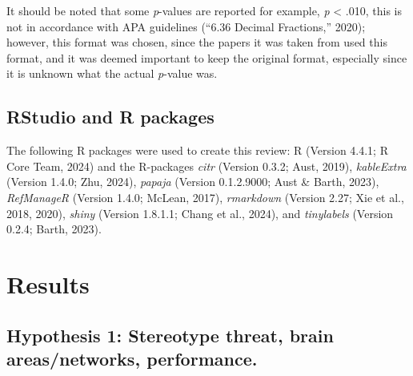 \documentclass[
  stu, a4paper,floatsintext]{apa7}
\begin{document}
It should be noted that some \emph{p}-values are reported for example, \emph{p} \textless{} .010, this is not in accordance with APA guidelines ({``6.36 {Decimal Fractions},''} 2020); however, this format was chosen, since the papers it was taken from used this format, and it was deemed important to keep the original format, especially since it is unknown what the actual \emph{p}-value was.

\subsection{RStudio and R packages}\label{rstudio-and-r-packages}

The following R packages were used to create this review: R (Version 4.4.1; R Core Team, 2024) and the R-packages \emph{citr} (Version 0.3.2; Aust, 2019), \emph{kableExtra} (Version 1.4.0; Zhu, 2024), \emph{papaja} (Version 0.1.2.9000; Aust \& Barth, 2023), \emph{RefManageR} (Version 1.4.0; McLean, 2017), \emph{rmarkdown} (Version 2.27; Xie et al., 2018, 2020), \emph{shiny} (Version 1.8.1.1; Chang et al., 2024), and \emph{tinylabels} (Version 0.2.4; Barth, 2023).

\section{Results}\label{results}

\subsection{Hypothesis 1: Stereotype threat, brain areas/networks, performance.}\label{hypothesis-1-stereotype-threat-brain-areasnetworks-performance.}
\end{document}
